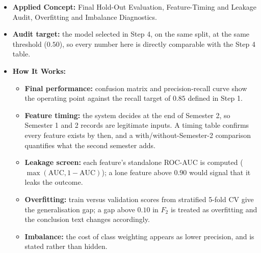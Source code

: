 \documentclass[11pt]{article}
\providecommand{\tightlist}{%
      \setlength{\itemsep}{0pt}\setlength{\parskip}{0pt}}
\begin{document}
\begin{itemize}
\tightlist
\item
  \textbf{Applied Concept:} Final Hold-Out Evaluation, Feature-Timing
  and Leakage Audit, Overfitting and Imbalance Diagnostics.
\item
  \textbf{Audit target:} the model selected in Step 4, on the same
  split, at the same threshold (\(0.50\)), so every number here is
  directly comparable with the Step 4 table.
\item
  \textbf{How It Works:}

  \begin{itemize}
  \tightlist
  \item
    \textbf{Final performance:} confusion matrix and precision-recall
    curve show the operating point against the recall target of \(0.85\)
    defined in Step 1.
  \item
    \textbf{Feature timing:} the system decides at the end of Semester
    2, so Semester 1 and 2 records are legitimate inputs. A timing table
    confirms every feature exists by then, and a with/without-Semester-2
    comparison quantifies what the second semester adds.
  \item
    \textbf{Leakage screen:} each feature's standalone ROC-AUC is
    computed (\(\max(\text{AUC}, 1-\text{AUC})\)); a lone feature above
    \(0.90\) would signal that it leaks the outcome.
  \item
    \textbf{Overfitting:} train versus validation scores from stratified
    5-fold CV give the generalisation gap; a gap above \(0.10\) in
    \(F_2\) is treated as overfitting and the conclusion text changes
    accordingly.
  \item
    \textbf{Imbalance:} the cost of class weighting appears as lower
    precision, and is stated rather than hidden.
  \end{itemize}
\end{itemize}
\end{document}
